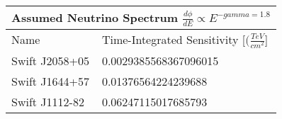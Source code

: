 \documentclass[]{article}
\begin{document}
\begin{tabular}{ |p{3.5cm}||p{4.5cm}|} 
\hline 
\multicolumn{2}{|c|}{Assumed Neutrino Spectrum $ \frac {d \phi}{dE} \propto E ^ {-gamma=1.8} $} \\ 
\hline 
Name&Time-Integrated Sensitivity [$ (\frac{TeV}{cm^{2}} $] \\ 
\hline 
Swift J2058+05 & \num[round-precision=2, round-mode=figures, scientific-notation=true]{0.0029385568367096015}  \\ 
Swift J1644+57 & \num[round-precision=2, round-mode=figures, scientific-notation=true]{0.01376564224239688}  \\ 
Swift J1112-82 & \num[round-precision=2, round-mode=figures, scientific-notation=true]{0.06247115017685793}  \\ 
\hline 
\end{tabular} 
\end{document}
